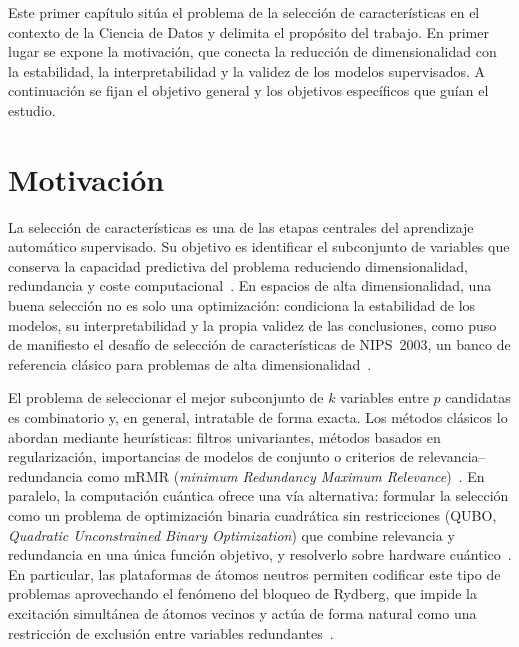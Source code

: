 
Este primer capítulo sitúa el problema de la selección de
características en el contexto de la Ciencia de Datos y delimita el
propósito del trabajo. En primer lugar se expone la motivación, que
conecta la reducción de dimensionalidad con la estabilidad, la
interpretabilidad y la validez de los modelos supervisados. A
continuación se fijan el objetivo general y los objetivos específicos
que guían el estudio.

\section{Motivación}

La selección de características es una de las etapas centrales del
aprendizaje automático supervisado. Su objetivo es identificar el
subconjunto de variables que conserva la capacidad predictiva del
problema reduciendo dimensionalidad, redundancia y coste
computacional~\cite{guyon2003}. En espacios de alta dimensionalidad,
una buena selección no es solo una optimización: condiciona la
estabilidad de los modelos, su interpretabilidad y la propia validez
de las conclusiones, como puso de manifiesto el desafío de selección
de características de NIPS~2003, un banco de referencia clásico para
problemas de alta dimensionalidad~\cite{guyon2004}.

El problema de seleccionar el mejor subconjunto de $k$ variables entre
$p$ candidatas es combinatorio y, en general, intratable de forma
exacta. Los métodos clásicos lo abordan mediante heurísticas: filtros
univariantes, métodos basados en regularización, importancias de
modelos de conjunto o criterios de relevancia--redundancia como
mRMR (\textit{minimum Redundancy Maximum Relevance})~\cite{peng2005}. En paralelo, la computación cuántica ofrece una
vía alternativa: formular la selección como un problema de
optimización binaria cuadrática sin restricciones (QUBO,
\textit{Quadratic Unconstrained Binary Optimization}) que combine
relevancia y redundancia en una única función objetivo, y resolverlo
sobre hardware cuántico~\cite{mucke2023}. En particular, las plataformas de átomos
neutros permiten codificar este tipo de problemas aprovechando el
fenómeno del bloqueo de Rydberg, que impide la excitación simultánea
de átomos vecinos y actúa de forma natural como una restricción de
exclusión entre variables redundantes~\cite{henriet2020}.

